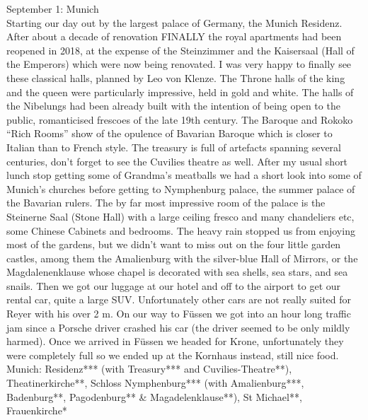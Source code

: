 September 1: Munich\\
Starting our day out by the largest palace of Germany, the Munich Residenz. After about a decade of renovation FINALLY the royal apartments had been reopened in 2018, at the expense of the Steinzimmer and the Kaisersaal (Hall of the Emperors) which were now being renovated. I was very happy to finally see these classical halls, planned by Leo von Klenze. The Throne halls of the king and the queen were particularly impressive, held in gold and white. The halls of the Nibelungs had been already built with the intention of being open to the public, romanticised frescoes of the late 19th century. The Baroque and Rokoko ``Rich Rooms'' show of the opulence of Bavarian Baroque which is closer to Italian than to French style. The treasury is full of artefacts spanning several centuries, don't forget to see the Cuvilies theatre as well. After my usual short lunch stop getting some of Grandma's meatballs we had a short look into some of Munich's churches before getting to Nymphenburg palace, the summer palace of the Bavarian rulers. The by far most impressive room of the palace is the Steinerne Saal (Stone Hall) with a large ceiling fresco and many chandeliers etc, some Chinese Cabinets and bedrooms. The heavy rain stopped us from enjoying most of the gardens, but we didn't want to miss out on the four little garden castles, among them the Amalienburg with the silver-blue Hall of Mirrors, or the Magdalenenklause whose chapel is decorated with sea shells, sea stars, and sea snails. Then we got our luggage at our hotel and off to the airport to get our rental car, quite a large SUV. Unfortunately other cars are not really suited for Reyer with his over 2 m. On our way to F\"ussen we got into an hour long traffic jam since a Porsche driver crashed his car (the driver seemed to be only mildly harmed). Once we arrived in F\"ussen we headed for Krone, unfortunately they were completely full so we ended up at the Kornhaus instead, still nice food.\\

Munich: Residenz*** (with Treasury*** and Cuvilies-Theatre**), Theatinerkirche**, Schloss Nymphenburg*** (with Amalienburg***, Badenburg**, Pagodenburg** \& Magadelenklause**), St Michael**, Frauenkirche*\\

